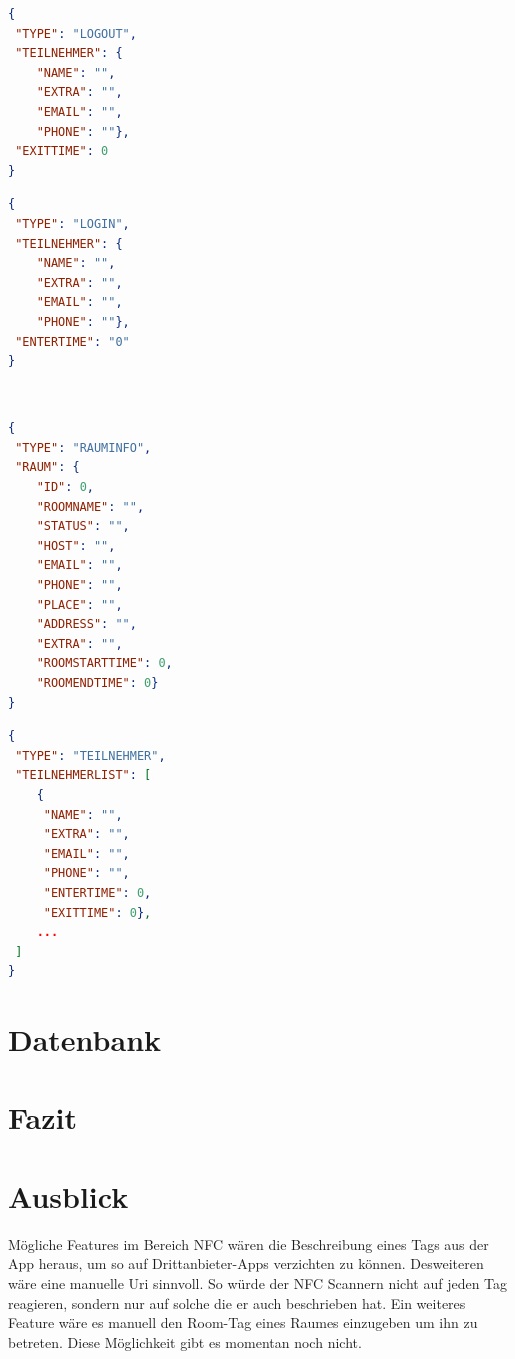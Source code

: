 \begin{minipage}[t]{0.45\linewidth}
\begin{lstlisting}[language=json, label={lst:anmeldung}, caption={anmeldung.json}]
{
 "TYPE": "LOGOUT",
 "TEILNEHMER": {
	"NAME": "",
	"EXTRA": "",
	"EMAIL": "",
	"PHONE": ""},
 "EXITTIME": 0
}
\end{lstlisting}
\end{minipage}
\qquad
\begin{minipage}[t]{0.45\linewidth}
\begin{lstlisting}[language=json,label={lst:abmeldung}, caption={abmeldung.json}]
{
 "TYPE": "LOGIN",
 "TEILNEHMER": {
	"NAME": "",
	"EXTRA": "",
	"EMAIL": "",
	"PHONE": ""},
 "ENTERTIME": "0"
}
\end{lstlisting}
\end{minipage}
\\
\begin{minipage}[t]{0.45\linewidth}
\begin{lstlisting}[language=json, label={lst:rauminfo}, caption={rauminfo.json}]
{
 "TYPE": "RAUMINFO",
 "RAUM": {
	"ID": 0,
	"ROOMNAME": "",
	"STATUS": "",
	"HOST": "",
	"EMAIL": "",
	"PHONE": "",
	"PLACE": "",
	"ADDRESS": "",
	"EXTRA": "",
	"ROOMSTARTTIME": 0,
	"ROOMENDTIME": 0}
}
\end{lstlisting}
\end{minipage}
\qquad
\begin{minipage}[t]{0.45\linewidth}
\begin{lstlisting}[language=json, label={lst:teilnehmer}, caption={teilnehmer.json}]
{
 "TYPE": "TEILNEHMER",
 "TEILNEHMERLIST": [
	{
	 "NAME": "",
	 "EXTRA": "",
 	 "EMAIL": "",
 	 "PHONE": "",
 	 "ENTERTIME": 0,
	 "EXITTIME": 0},
	...
 ]
}
\end{lstlisting}
\end{minipage}
\label{sec:MQTT Service}
\section{Datenbank}
\label{sec:Datenbank}
\section{Fazit}
\label{sec:Fazit}

\section{Ausblick}
\label{sec:Ausblick}
Mögliche Features im Bereich NFC wären die Beschreibung eines Tags aus der App heraus, um so auf Drittanbieter-Apps verzichten zu können. Desweiteren wäre eine manuelle Uri sinnvoll. So würde der NFC Scannern nicht auf jeden Tag reagieren, sondern nur auf solche die er auch beschrieben hat. Ein weiteres Feature wäre es manuell den Room-Tag eines Raumes einzugeben um ihn zu betreten. Diese Möglichkeit gibt es momentan noch nicht.

